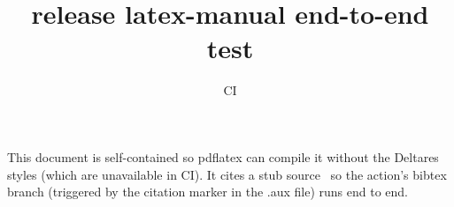 \documentclass{article}
\title{release latex-manual end-to-end test}
\author{CI}
\begin{document}
\maketitle
This document is self-contained so pdflatex can compile it without the
Deltares styles (which are unavailable in CI). It cites a stub
source~\cite{stub2026} so the action's bibtex branch (triggered by the
citation marker in the .aux file) runs end to end.



\end{document}

